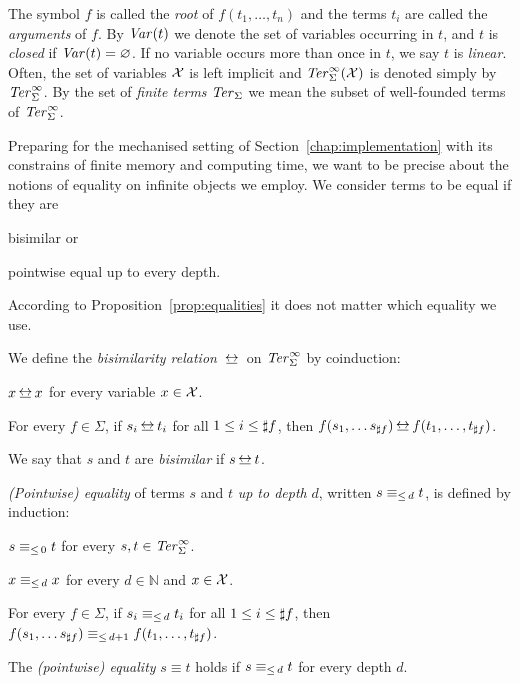 The symbol $f$ is called the \emph{root} of $f(t_1, \ldots, t_n)$ and
the terms $t_i$ are called the \emph{arguments} of $f$. By $\mathit{Var}(t)$
we denote the set of variables occurring in $t$, and $t$ is
\emph{closed} if $\mathit{Var}(t) = \varnothing$. If no variable occurs more than
once in $t$, we say $t$ is \emph{linear}. Often, the set of variables
$\mathcal{X}$ is left implicit and $\mathit{Ter}_\Sigma^\infty(\mathcal{X})$ is denoted simply by $\mathit{Ter}_\Sigma^\infty$. By
the set of \emph{finite terms} $\mathit{Ter}_\Sigma$ we mean the subset of
well-founded terms of $\mathit{Ter}_\Sigma^\infty$.

Preparing for the mechanised setting of Section~\ref{chap:implementation} with
its constrains of finite memory and computing time, we want to be precise
about the notions of equality on infinite objects we employ. We consider terms
to be equal if they are
\begin{inparaenum}[(i)]
  \item bisimilar or
  \item pointwise equal up to every depth.
\end{inparaenum}
According to Proposition~\ref{prop:equalities} it does not matter
which equality we use.

\begin{definition}\label{def:bisimilarity}%
We define the \emph{bisimilarity relation} $\bis$ on $\mathit{Ter}_\Sigma^\infty$ by
coinduction:
\begin{compactenum}
  \item
    $x \bis x$ for every variable $x \in \mathcal{X}$.
  \item
    For every $f \in \Sigma$, if $s_i \bis t_i$ for all $1 \leq i \leq
    \sharp f$, then $f(s_1, \ldots s_{\arity{f}}) \bis f(t_1, \ldots,
    t_{\arity{f}})$.
\end{compactenum}
We say that $s$ and $t$ are \emph{bisimilar} if $s \bis t$.
\end{definition}

\begin{definition}\label{def:equiv}%
\emph{(Pointwise) equality} of terms $s$ and $t$ \emph{up to depth} $d$,
written $s \equiv_{\le \, d} t$, is defined by induction:
\begin{compactenum}
  \item $s \equiv_{\le \, 0} t$ for every $s, t \in \mathit{Ter}_\Sigma^\infty$.
  \item $x \equiv_{\le \, d} x$ for every $d \in \mathbb{N}$ and $x \in \mathcal{X}$.
  \item For every $f \in \Sigma$, if $s_i \equiv_{\le \, d} t_i$ for all $1 \leq i
    \leq \sharp f$, then $f(s_1, \ldots s_{\sharp f}) \equiv_{\le \, d+1}
    f(t_1, \ldots, t_{\sharp f})$.
\end{compactenum}
The \emph{(pointwise) equality} $s \equiv t$ holds if $s \equiv_{\le \, d}
t$ for every depth $d$.
\end{definition}

